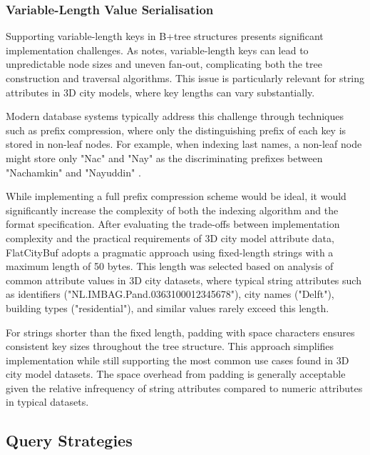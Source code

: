 \subsubsection{Variable-Length Value Serialisation}
\label{methodology:attribute_index:variable_length_serialisation}

Supporting variable-length keys in B+tree structures presents significant implementation challenges. As \citet{ramez_2015} notes, variable-length keys can lead to unpredictable node sizes and uneven fan-out, complicating both the tree construction and traversal algorithms. This issue is particularly relevant for string attributes in 3D city models, where key lengths can vary substantially.

Modern database systems typically address this challenge through techniques such as prefix compression, where only the distinguishing prefix of each key is stored in non-leaf nodes. For example, when indexing last names, a non-leaf node might store only "Nac" and "Nay" as the discriminating prefixes between "Nachamkin" and "Nayuddin" \citep{ramez_2015}.

While implementing a full prefix compression scheme would be ideal, it would significantly increase the complexity of both the indexing algorithm and the format specification. After evaluating the trade-offs between implementation complexity and the practical requirements of 3D city model attribute data, FlatCityBuf adopts a pragmatic approach using fixed-length strings with a maximum length of 50 bytes. This length was selected based on analysis of common attribute values in 3D city datasets, where typical string attributes such as identifiers ("NL.IMBAG.Pand.0363100012345678"), city names ("Delft"), building types ("residential"), and similar values rarely exceed this length.

For strings shorter than the fixed length, padding with space characters ensures consistent key sizes throughout the tree structure. This approach simplifies implementation while still supporting the most common use cases found in 3D city model datasets. The space overhead from padding is generally acceptable given the relative infrequency of string attributes compared to numeric attributes in typical datasets.

\subsection{Query Strategies}
\label{methodology:attribute_index:query_strategies}

